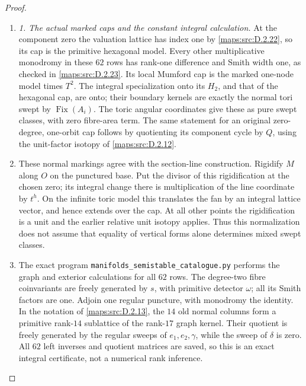 \begin{proof}
\begin{enumerate}[label=\arabic*.,leftmargin=*]
\item \emph{1. The actual marked caps and the constant integral calculation.}
At the component zero the valuation lattice has index one by \ref{maps:src:D.2.22},
so its cap is the primitive hexagonal model. Every other
multiplicative monodromy in these $62$ rows has rank-one difference
and Smith width one, as checked in \ref{maps:src:D.2.23}. Its local Mumford cap is
the marked one-node model times $T^2$. The integral specialization
onto its $H_2$, and that of the hexagonal cap, are onto; their
boundary kernels are exactly the normal tori swept by
$\operatorname{Fix}(A_i)$. The toric angular coordinates give these
as pure swept classes, with zero fibre-area term. The same statement
for an original zero-degree, one-orbit cap follows by quotienting
its component cycle by $Q$, using the unit-factor isotopy of \ref{maps:src:D.2.12}.

\item These normal markings agree with the section-line construction.
Rigidify $M$ along $O$ on the punctured base. Put the divisor of this
rigidification at the chosen zero; its integral change there is
multiplication of the line coordinate by $t^h$. On the infinite
toric model this translates the fan by an integral lattice vector,
and hence extends over the cap. At all other points the
rigidification is a unit and the earlier relative unit isotopy
applies. Thus this normalization does not assume that equality of
vertical forms alone determines mixed swept classes.

\item The exact program \texttt{manifolds\_semistable\_catalogue.py}
performs the graph and exterior calculations for all $62$ rows.
The degree-two fibre coinvariants are freely generated by $s$,
with primitive detector $\omega$; all its Smith factors are one.
Adjoin one regular puncture, with monodromy the identity. In the
notation of \ref{maps:src:D.2.13}, the $14$ old normal columns form a primitive
rank-$14$ sublattice of the rank-$17$ graph kernel. Their quotient
is freely generated by the regular sweeps of $e_1,e_2,\gamma$,
while the sweep of $\delta$ is zero. All $62$ left inverses and
quotient matrices are saved, so this is an exact integral
certificate, not a numerical rank inference.


\end{enumerate}
\end{proof}
